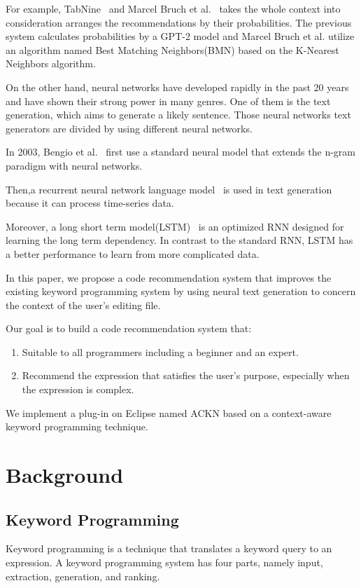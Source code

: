 \documentclass[PRO,english]{ipsj}
\begin{document}
For example, TabNine~\cite{TabNine} and Marcel Bruch et al.~\cite{Marcel} takes the whole context into consideration arranges the recommendations by their probabilities. The previous system calculates probabilities by a GPT-2 model and Marcel Bruch et al. utilize an algorithm named Best Matching Neighbors(BMN) based on the K-Nearest Neighbors algorithm. 

On the other hand, neural networks have developed rapidly in the past 20 years and have shown their strong power in many genres. One of them is the text generation, which aims to generate a likely sentence. Those neural networks text generators are divided by using different neural networks.~\cite{NNTG}

In 2003, Bengio et al.~\cite{Bengio} first use a standard neural model that extends the n-gram paradigm with neural networks. 

Then,a recurrent neural network language model~\cite{RNN} is used in text generation because it can process time-series data.

Moreover, a long short term model(LSTM)~\cite{LSTM} is an optimized RNN designed for learning the long term dependency. In contrast to the standard RNN, LSTM has a better performance to learn from more complicated data.
		
In this paper, we propose a code recommendation system that improves the existing keyword programming system by using neural text generation to concern the context of the user’s editing file.

Our goal is to build a code recommendation system that:
\begin{enumerate}
\item Suitable to all programmers including a beginner and an expert.
\item Recommend the expression that satisfies the user’s purpose, especially when the expression is complex.

\end{enumerate}
We implement a plug-in on Eclipse named ACKN based on a context-aware keyword programming technique. 

\section{Background}
\subsection{Keyword Programming}
Keyword programming is a technique that translates a keyword query to an expression. A keyword programming system has four parts, namely input, extraction, generation, and ranking. 
\end{document}

